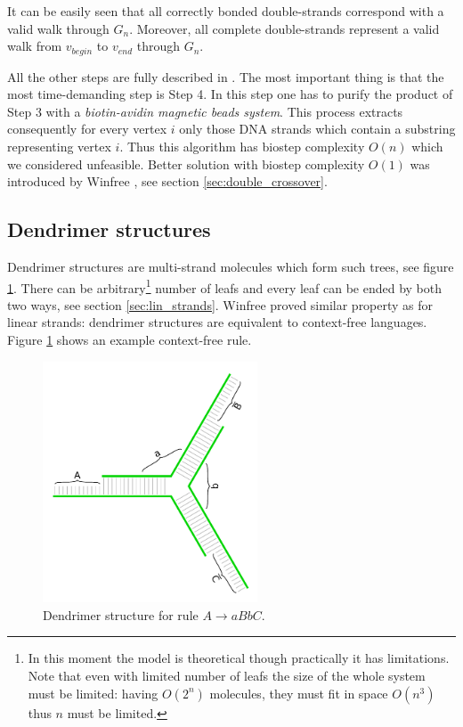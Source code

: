 		It can be easily seen that all correctly bonded double-strands correspond with a valid walk through $G_n$. Moreover, all complete double-strands represent a valid walk from $v_{begin}$ to $v_{end}$ through $G_n$.
		
		All the other steps are fully described in \cite{adleman94}. The most important thing is that the most time-demanding step is Step 4. In this step one has to purify the product of Step 3 with a {\em biotin-avidin magnetic beads system}. This process extracts consequently for every vertex $i$ only those DNA strands which contain a substring representing vertex $i$. Thus this algorithm has biostep complexity $O(n)$ which we considered unfeasible. Better solution with biostep complexity $O(1)$ was introduced by Winfree \cite{winfree_phd}, see section \ref{sec:double_crossover}. %
	
	\subsection{Dendrimer structures}
	\label{sec:dendrimer}
		
		Dendrimer structures are multi-strand molecules which form such trees, see figure \ref{fig:dendrimer}. There can be arbitrary\footnote{In this moment the model is theoretical though practically it has limitations. Note that even with limited number of leafs the size of the whole system must be limited: having $O(2^n)$ molecules, they must fit in space $O(n^3)$ thus $n$ must be limited.} number of leafs and every leaf can be ended by both two ways, see section \ref{sec:lin_strands}. Winfree \cite{winfree_phd} proved similar property as for linear strands: dendrimer structures are equivalent to context-free languages. Figure \ref{fig:dendrimer} shows an example context-free rule.
		
		\begin{figure}[H]
		\begin{center}
			\includegraphics[width=0.568\textwidth]{./figures/strand_types/dendrimer.pdf}
			\caption{Dendrimer structure for rule $A\rightarrow aBbC$.}
			\label{fig:dendrimer}
		\end{center}
		\end{figure}
	
